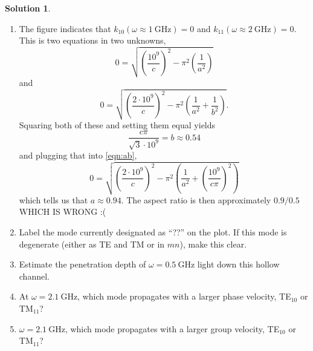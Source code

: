 \documentclass[10pt]{article}
\theoremstyle{definition}
\newtheorem{soln}{Solution}
\begin{document}
\begin{soln}~
  \begin{enumerate}[label=(\alph*)]
    \item The figure indicates that $k_{10}(\omega\approx\qty{1}{\giga\hertz})=0$ and $k_{11}(\omega\approx\qty{2}{\giga\hertz})=0$.
          This is two equations in two unknowns,
          \begin{equation*}
            0=\sqrt{\left(\frac{10^9}{c}\right)^2-\pi^2\left(\frac{1}{a^2}\right)}
          \end{equation*}
          and
          \begin{equation}
            0=\sqrt{\left(\frac{2\cdot 10^9}{c}\right)^2-\pi^2\left(\frac{1}{a^2}+\frac{1}{b^2}\right)}.
            \label{eqn:ab}
          \end{equation}
          Squaring both of these and setting them equal yields
          $$\frac{c\pi}{\sqrt{3}\cdot 10^9}=b\approx 0.54$$
          and plugging that into \cref{eqn:ab},
          $$0=\sqrt{\left(\frac{2\cdot 10^9}{c}\right)^2-\pi^2\left(\frac{1}{a^2}+\left(\frac{10^9}{c\pi}\right)^2\right)}$$
          which tells us that $a\approx0.94.$
          The aspect ratio is then approximately $0.9/0.5$ WHICH IS WRONG :(

    \item Label the mode currently designated as “??” on the plot. If this mode is
          degenerate (either as TE and TM or in $mn$), make this clear.
    \item Estimate the penetration depth of
          $\omega=\qty{0.5}{\giga\hertz}$ light down this hollow channel.
    \item At $\omega=\qty{2.1}{\giga\hertz}$, which mode propagates with a larger phase velocity, TE$_{10}$
          or TM$_{11}$?
    \item $\omega=\qty{2.1}{\giga\hertz}$, which mode propagates with a larger group velocity, TE$_{10}$
          or TM$_{11}$?
  \end{enumerate}
\end{soln}
\end{document}

